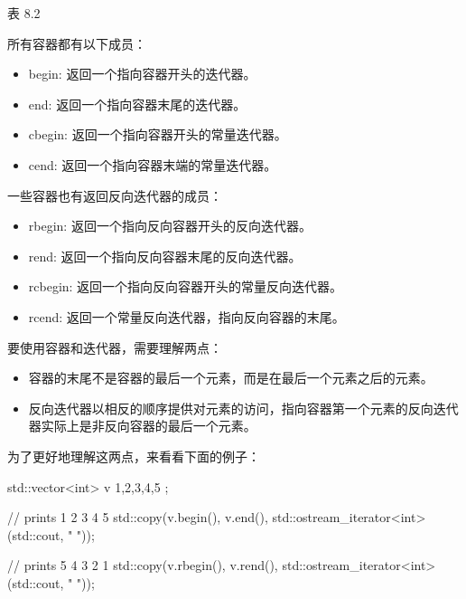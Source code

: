 \begin{center}
表 8.2
\end{center}

所有容器都有以下成员：

\begin{itemize}
\item
begin: 返回一个指向容器开头的迭代器。

\item
end: 返回一个指向容器末尾的迭代器。

\item
cbegin: 返回一个指向容器开头的常量迭代器。

\item
cend: 返回一个指向容器末端的常量迭代器。
\end{itemize}

一些容器也有返回反向迭代器的成员：

\begin{itemize}
\item
rbegin: 返回一个指向反向容器开头的反向迭代器。

\item
rend: 返回一个指向反向容器末尾的反向迭代器。

\item
rcbegin: 返回一个指向反向容器开头的常量反向迭代器。

\item
rcend: 返回一个常量反向迭代器，指向反向容器的末尾。
\end{itemize}

要使用容器和迭代器，需要理解两点：

\begin{itemize}
\item
容器的末尾不是容器的最后一个元素，而是在最后一个元素之后的元素。

\item
反向迭代器以相反的顺序提供对元素的访问，指向容器第一个元素的反向迭代器实际上是非反向容器的最后一个元素。
\end{itemize}

为了更好地理解这两点，来看看下面的例子：

\begin{cpp}
std::vector<int> v{ 1,2,3,4,5 };

// prints 1 2 3 4 5
std::copy(v.begin(), v.end(),
		  std::ostream_iterator<int>(std::cout, " "));

// prints 5 4 3 2 1
std::copy(v.rbegin(), v.rend(),
		  std::ostream_iterator<int>(std::cout, " "));
\end{cpp}

